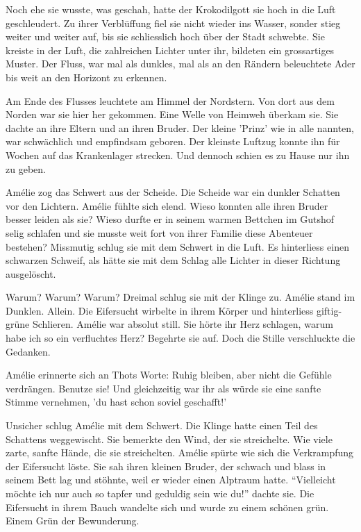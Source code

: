 \documentclass[11pt,titlepage,a5paper]{book}
\begin{document}
Noch ehe sie wusste, was geschah, hatte der Krokodilgott sie hoch in die Luft geschleudert. Zu ihrer Verblüffung fiel sie nicht wieder ins Wasser, sonder stieg weiter und weiter auf, bis sie schliesslich hoch über der Stadt schwebte. Sie kreiste in der Luft, die zahlreichen Lichter unter ihr, bildeten ein grossartiges Muster. Der Fluss, war mal als dunkles, mal als an den Rändern beleuchtete Ader bis weit an den Horizont zu erkennen. 

Am Ende des Flusses leuchtete am Himmel der Nordstern. Von dort aus dem Norden war sie hier her gekommen. Eine Welle von Heimweh überkam sie. Sie dachte an ihre Eltern und an ihren Bruder. Der kleine 'Prinz' wie in alle nannten, war schwächlich und empfindsam geboren. Der kleinste Luftzug konnte ihn für Wochen auf das Krankenlager strecken. Und dennoch schien es zu Hause nur ihn zu geben. 

Amélie zog das Schwert aus der Scheide. Die Scheide war ein dunkler Schatten vor den Lichtern. Amélie fühlte sich elend. Wieso konnten alle ihren Bruder besser leiden als sie? Wieso durfte er in seinem warmen Bettchen im Gutshof selig schlafen und sie musste weit fort von ihrer Familie diese Abenteuer bestehen? Missmutig schlug sie mit dem Schwert in die Luft. Es hinterliess einen schwarzen Schweif, als hätte sie mit dem Schlag alle Lichter in dieser Richtung ausgelöscht. 

Warum? Warum? Warum? Dreimal schlug sie mit der Klinge zu. Amélie stand im Dunklen. Allein. Die Eifersucht wirbelte in ihrem Körper und hinterliess giftig-grüne Schlieren. Amélie war absolut still. Sie hörte ihr Herz schlagen, warum habe ich so ein verfluchtes Herz? Begehrte sie auf. Doch die Stille verschluckte die Gedanken.

Amélie erinnerte sich an Thots Worte: Ruhig bleiben, aber nicht die Gefühle verdrängen. Benutze sie! Und gleichzeitig war ihr als würde sie eine sanfte Stimme vernehmen, 'du hast schon soviel geschafft!'

Unsicher schlug Amélie mit dem Schwert. Die Klinge hatte einen Teil des Schattens weggewischt. Sie bemerkte den Wind, der sie streichelte. Wie viele zarte, sanfte Hände, die sie streichelten. Amélie spürte wie sich die Verkrampfung der Eifersucht löste. Sie sah ihren kleinen Bruder, der schwach und blass in seinem Bett lag und stöhnte, weil er wieder einen Alptraum hatte. "`Vielleicht möchte ich nur auch so tapfer und geduldig sein wie du!"' dachte sie. Die Eifersucht in ihrem Bauch wandelte sich und wurde zu einem schönen grün. Einem Grün der Bewunderung.
\end{document}
